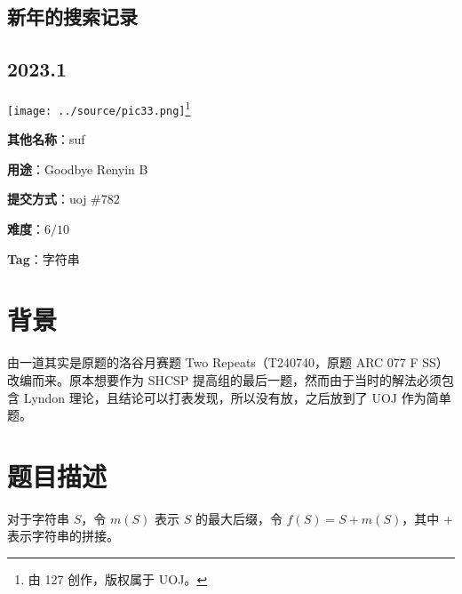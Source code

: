 \documentclass[a4paper,10pt]{article}
\begin{document}
\vspace*{\fill}
\begin{center}

\section{新年的搜索记录}

\subsection*{2023.1}

\vspace{10pt}

\texttt{[image: ../source/pic33.png]}\footnote{由 127 创作，版权属于 UOJ。}

\vspace{10pt}

\textbf{其他名称}：suf

\vspace{10pt}

\textbf{用途}：Goodbye Renyin B

\vspace{10pt}

\textbf{提交方式}：uoj \#782

\vspace{10pt}

\textbf{难度}：$6/10$

\vspace{10pt}

\textbf{Tag}：字符串

\end{center}
\vspace*{\fill}

\newpage

\section*{背景}

由一道其实是原题的洛谷月赛题 Two Repeats（T240740，原题 ARC 077 F SS）改编而来。原本想要作为 SHCSP 提高组的最后一题，然而由于当时的解法必须包含 Lyndon 理论，且结论可以打表发现，所以没有放，之后放到了 UOJ 作为简单题。

\section*{题目描述}

对于字符串 $S$，令 $m(S)$ 表示 $S$ 的最大后缀，令 $f(S)=S+m(S)$，其中 $+$ 表示字符串的拼接。
\end{document}
